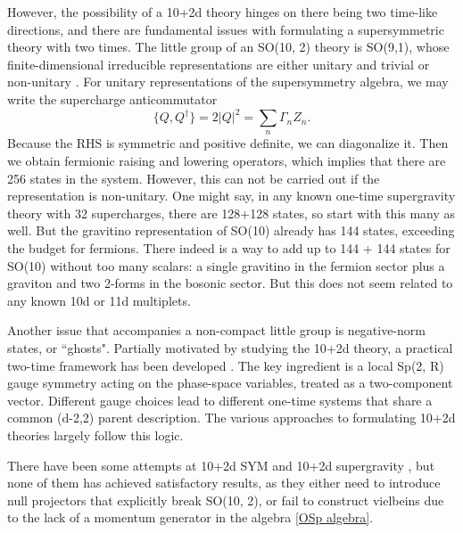 However, the possibility of a 10+2d theory hinges on there being two time-like directions, and there are fundamental issues with formulating a supersymmetric theory with two times.
The little group of an SO(10, 2) theory is SO(9,1), whose finite-dimensional irreducible representations are either unitary and trivial or non-unitary \cite{Weinberg:1995mt}.
For unitary representations of the supersymmetry algebra, we may write the supercharge anticommutator 
\begin{equation}
\{Q,Q^\dagger\}=2|Q|^2=\sum_n\Gamma_n Z_n.
\end{equation}
Because the RHS is symmetric and positive definite, we can diagonalize it.
Then we obtain fermionic raising and lowering operators, which implies that there are 256 states in the system. 
However, this can not be carried out if the representation is non-unitary.
One might say, in any known one-time supergravity theory with 32 supercharges, there are 128+128 states, so start with this many as well. 
But the gravitino representation of SO(10) already has 144 states, exceeding the budget for fermions. There indeed is a way to add up to 144 + 144 states for SO(10) without too many scalars: a single gravitino in the fermion sector plus a graviton and two 2-forms in the bosonic sector. But this does not seem related to any known 10d or 11d multiplets.


Another issue that accompanies a non-compact little group is negative-norm states, or ``ghosts".
Partially motivated by studying the 10+2d theory, a practical two-time framework has been developed \cite{Bars:1998cs,Bars:1998ui,Bars:1999nk,Bars:1999uq,Bars:2000qm}. 
The key ingredient is a local Sp(2, R) gauge symmetry acting on the phase-space variables, treated as a two-component vector.
Different gauge choices lead to different one-time systems that share a common (d-2,2) parent description.
The various approaches to formulating 10+2d theories largely follow this logic.

There have been some attempts at 10+2d SYM \cite{Nishino:1996wp,Sezgin:1997gr,Nishino:1997hk,Nishino:1997ia,Nishino:1999ck} and 10+2d supergravity \cite{Nishino:1997gq,Nishino:1997sw,Nishino:1998qn}, but none of them has achieved satisfactory results, as they either need to introduce null projectors that explicitly break SO(10, 2),
or fail to construct vielbeins due to the lack of a momentum generator \cite{Hewson:1999tf} in the algebra \eqref{OSp algebra}. 


